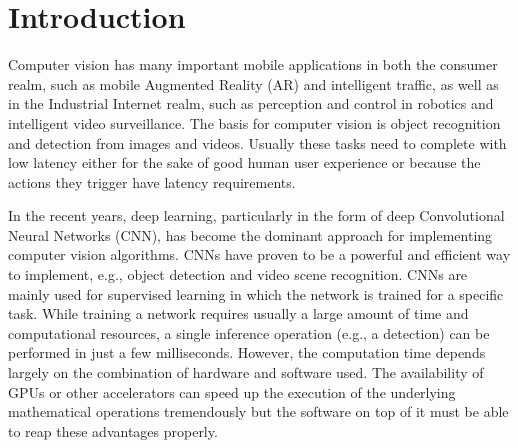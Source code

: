 \documentclass[sigconf]{acmart}
\begin{document}




\maketitle

\section{Introduction}

Computer vision has many important mobile applications in both the consumer realm, such as mobile Augmented Reality (AR) and intelligent traffic, as well as in the Industrial Internet realm, such as perception and control in robotics and intelligent video surveillance.
The basis for computer vision is object recognition and detection from images and videos. Usually these tasks need to complete with low latency either for the sake of good human user experience or because the actions they trigger have latency requirements.

In the recent years, deep learning, particularly in the form of deep Convolutional Neural Networks (CNN), has become the dominant approach for implementing computer vision algorithms\cite{lecun15nature}. CNNs have proven to be a powerful and efficient way to implement, e.g., object detection and video scene recognition. CNNs are mainly used for supervised learning in which the network is trained for a specific task. While training a network requires usually a large amount of time and computational resources, a single inference operation (e.g., a detection) can be performed in just a few milliseconds\cite{redmon16CVPR}. However, the computation time depends largely on the combination of hardware and software used. The availability of GPUs or other accelerators can speed up the execution of the underlying mathematical operations tremendously but the software on top of it must be able to reap these advantages properly.
\end{document}
